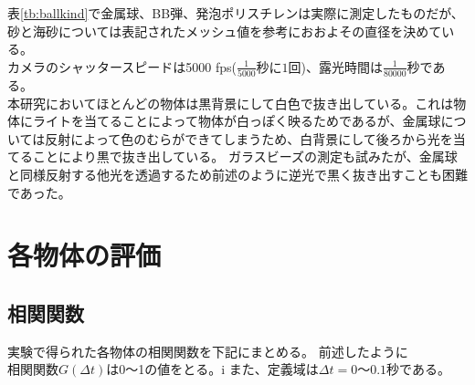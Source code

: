 \documentclass[a4paper,10pt,twocolumn,dvipdfmx]{jsarticle}
\begin{document}
表\ref{tb:ballkind}で金属球、BB弾、発泡ポリスチレンは実際に測定したものだが、砂と海砂については表記されたメッシュ値を参考におおよその直径を決めている。 \\
カメラのシャッタースピードは5000 fps($\frac{1}{5000}秒に1回$)、露光時間は$\frac{1}{80000}秒$である。 \\
本研究においてほとんどの物体は黒背景にして白色で抜き出している。これは物体にライトを当てることによって物体が白っぽく映るためであるが、金属球については反射によって色のむらができてしまうため、白背景にして後ろから光を当てることにより黒で抜き出している。
ガラスビーズの測定も試みたが、金属球と同様反射する他光を透過するため前述のように逆光で黒く抜き出すことも困難であった。

\section{各物体の評価}
\subsection{相関関数}
実験で得られた各物体の相関関数を下記にまとめる。
前述したように$相関関数G(\Delta t)$は0〜1の値をとる。i
また、定義域は$\Delta t=0〜0.1秒$である。
\end{document}
